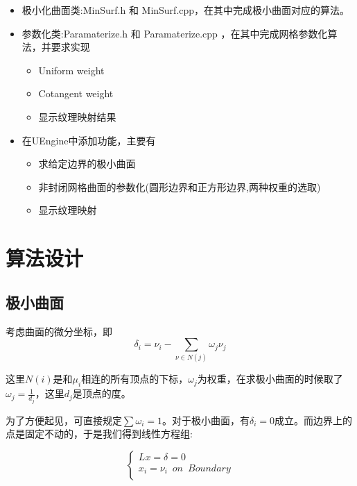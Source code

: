 \documentclass{article}
\begin{document}
    \begin{itemize}
    	\item  极小化曲面类:MinSurf.h 和 MinSurf.cpp，在其中完成极小曲面对应的算法。
    \end{itemize}

    \begin{itemize}
	\item  参数化类:Paramaterize.h 和 Paramaterize.cpp ，在其中完成网格参数化算法，并要求实现
	\begin{itemize}[label=$\circ$, itemjoin=\hspace{0.5em}]
		\item Uniform weight 
		\item Cotangent weight
		\item 显示纹理映射结果
	\end{itemize}
    \end{itemize}

\begin{itemize}
	\item  在UEngine中添加功能，主要有
	\begin{itemize}[label=$\circ$, itemjoin=\hspace{0.5em}]
		\item 求给定边界的极小曲面
		\item 非封闭网格曲面的参数化(圆形边界和正方形边界,两种权重的选取)
		\item 显示纹理映射
	\end{itemize}
\end{itemize}


	\section{算法设计}
	
	\subsection{极小曲面}
	
	考虑曲面的微分坐标，即
	$$ \delta_i = \nu_i -  \sum\limits_{\nu \in N(j)}\omega_j \nu_j  $$
	
	这里$N(i)$是和$\mu_i$相连的所有顶点的下标，$\omega_j$为权重，在求极小曲面的时候取了$\omega_j=  \frac{1}{d_j}$，这里$d_j$是顶点的度。
	
	为了方便起见，可直接规定$\sum \omega_i = 1 $。对于极小曲面，有$\delta_i = 0$成立。而边界上的点是固定不动的，于是我们得到线性方程组:
	
		$$ \left\{ 
	\begin{array}{lc}
		Lx=\delta=0   \\
		x_i=\nu_i  \enspace on  \enspace  Boundary   \\
	\end{array}
	\right.$$
	
\end{document}
